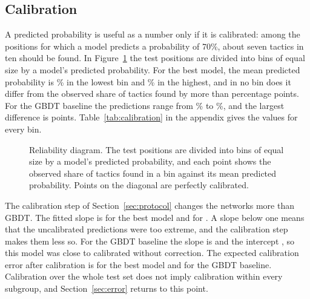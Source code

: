 \documentclass[11pt]{article}
\begin{document}
\begin{table}[htbp]\centering\small
{}
\caption{All metrics for every model on the test set. For the log loss, the
Brier score and the calibration error lower is better. For PR-AUC and ROC-AUC
higher is better.}
\label{tab:metrics}
\end{table}

\subsection{Calibration}

A predicted probability is useful as a number only if it is calibrated: among
the positions for which a model predicts a probability of 70\%, about seven
tactics in ten should be found. In Figure~\ref{fig:calibration} the test
positions are divided into  bins of equal size by
a model's predicted probability. For the best model, the mean predicted
probability is \% in the lowest bin and
\% in the highest, and in no bin does it differ
from the observed share of tactics found by more than
 percentage points. For the GBDT baseline the
predictions range from \% to
\%, and the largest difference is
 points. Table~\ref{tab:calibration} in
the appendix gives the values for every bin.

\begin{figure}[htbp]\centering
{}
\caption{Reliability diagram. The test positions are divided into
 bins of equal size by a model's predicted
probability, and each point shows the observed share of tactics found in a
bin against its mean predicted probability. Points on the diagonal are
perfectly calibrated.}
\label{fig:calibration}
\end{figure}

The calibration step of Section~\ref{sec:protocol} changes the networks more
than GBDT. The fitted slope is  for the best model and
 for
. A slope below one means that the uncalibrated
predictions were too extreme, and the calibration step makes them less so.
For the GBDT baseline the slope is  and the
intercept , so this model was close to
calibrated without correction. The expected
calibration error after calibration is  for the
best model and  for the GBDT baseline.
Calibration over the whole test set does not imply calibration within every
subgroup, and Section~\ref{sec:error} returns to this point.
\end{document}
